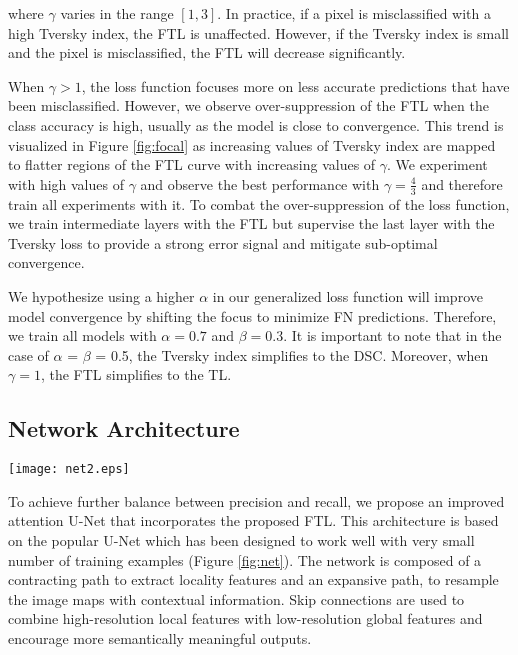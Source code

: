 \documentclass{article}
\begin{document}
where $\gamma$ varies in the range $[1,3]$. In practice, if a pixel is misclassified with a high Tversky index, the FTL is unaffected. However, if the Tversky index is small and the pixel is misclassified, the FTL will decrease significantly. 

When $\gamma>1$, the loss function focuses more on less accurate predictions that have been misclassified. However, we observe over-suppression of the FTL when the class accuracy is high, usually as the model is close to convergence. This trend is visualized in Figure \ref{fig:focal} as increasing values of Tversky index are mapped to flatter regions of the FTL curve with increasing values of $\gamma$. We experiment with high values of $\gamma$ and observe the best performance with $\gamma = \frac{4}{3}$ and therefore train all experiments with it. To combat the over-suppression of the loss function, we train intermediate layers with the FTL but supervise the last layer with the Tversky loss to provide a strong error signal and mitigate sub-optimal convergence. 

We hypothesize using a higher $\alpha$ in our generalized loss function will improve model convergence by shifting the focus to minimize FN predictions. Therefore, we train all models with $\alpha=0.7$ and $\beta=0.3$. It is important to note that in the case of $\alpha$ = $\beta$ = 0.5, the Tversky index simplifies to the DSC. Moreover, when $\gamma = 1$, the FTL simplifies to the TL.

\subsection{Network Architecture}

\begin{figure*}[h]
	\centering
	\texttt{[image: net2.eps]}
	\caption{Proposed Attention U-Net architecture with input image pyramid and deep supervised output layers. }
	\label{fig:net}
\end{figure*}

To achieve further balance between precision and recall, we propose an improved attention U-Net \cite{oktay} that incorporates the proposed FTL. This architecture is based on the popular U-Net which has been designed to work well with very small number of training examples (Figure \ref{fig:net}). The network is composed of a contracting path to extract locality features and an expansive path, to resample the image maps with contextual information. Skip connections are used to combine high-resolution local features with low-resolution global features and encourage more semantically meaningful outputs.
\end{document}
